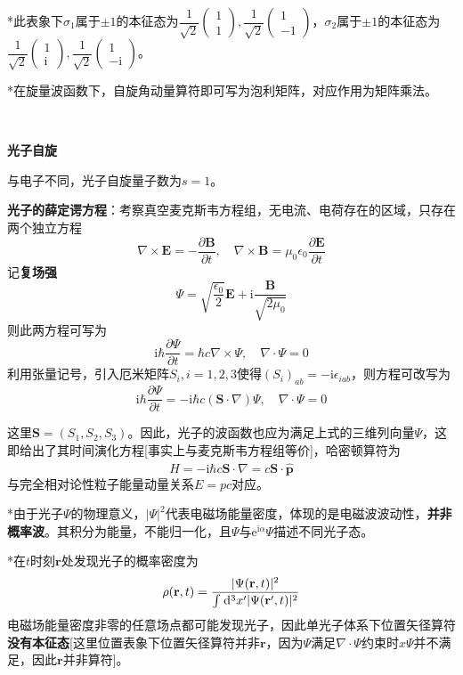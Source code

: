 \documentclass[a4paper,UTF8,fontset=windows]{ctexart}
\newcommand*{\dr}{\hspace{0.07em}\mathrm{d}}
\newcommand*{\ir}{\mathrm{i}}
\newcommand*{\er}{\mathrm{e}}
\newcommand*{\br}{\mathbf{r}}
\newcommand*{\bp}{\mathbf{p}}
\begin{document}
*此表象下$\sigma_1$属于$\pm1$的本征态为$\dfrac{1}{\sqrt2}\begin{pmatrix}1\\1\end{pmatrix},\dfrac{1}{\sqrt2}\begin{pmatrix}1\\-1\end{pmatrix}$，$\sigma_2$属于$\pm1$的本征态为$\dfrac{1}{\sqrt2}\begin{pmatrix}1\\\ir\end{pmatrix},\dfrac{1}{\sqrt2}\begin{pmatrix}1\\-\ir\end{pmatrix}$。

*在旋量波函数下，自旋角动量算符即可写为泡利矩阵，对应作用为矩阵乘法。

\

\textbf{光子自旋}

与电子不同，光子自旋量子数为$s=1$。

\textbf{光子的薛定谔方程}：考察真空麦克斯韦方程组，无电流、电荷存在的区域，只存在两个独立方程
$$\nabla\times\mathbf{E}=-\frac{\partial\mathbf{B}}{\partial t},\quad\nabla\times\mathbf{B}=\mu_0\epsilon_0\frac{\partial\mathbf{E}}{\partial t}$$
记\textbf{复场强}
$$\Psi=\sqrt{\frac{\epsilon_0}{2}}\mathbf{E}+\ir\frac{\mathbf{B}}{\sqrt{2\mu_0}}$$
则此两方程可写为
$$\ir\hbar\frac{\partial\Psi}{\partial t}=\hbar c\nabla\times\Psi,\quad\nabla\cdot\Psi=0$$
利用张量记号，引入厄米矩阵$S_i,i=1,2,3$使得$(S_i)_{ab}=-\ir\epsilon_{iab}$，则方程可改写为
$$\ir\hbar\frac{\partial\Psi}{\partial t}=-\ir\hbar c(\mathbf{S}\cdot\nabla)\Psi,\quad\nabla\cdot\Psi=0$$

这里$\mathbf{S}=(S_1,S_2,S_3)$。因此，光子的波函数也应为满足上式的三维列向量$\Psi$，这即给出了其时间演化方程[事实上与麦克斯韦方程组等价]，哈密顿算符为
$$\hat{H}=-\ir\hbar c\mathbf{S}\cdot\nabla=c\mathbf{S}\cdot\hat{\bp}$$
与完全相对论性粒子能量动量关系$E=pc$对应。

*由于光子$\Psi$的物理意义，$|\Psi|^2$代表电磁场能量密度，体现的是电磁波波动性，\textbf{并非概率波}。其积分为能量，不能归一化，且$\Psi$与$\er^{\ir\alpha}\Psi$描述不同光子态。

*在$t$时刻$\br$处发现光子的概率密度为
$$\rho(\br,t)=\frac{|\Psi(\br,t)|^2}{\int\dr^3x'|\Psi(\br',t)|^2}$$
电磁场能量密度非零的任意场点都可能发现光子，因此单光子体系下位置矢径算符\textbf{没有本征态}[这里位置表象下位置矢径算符并非$\br$，因为$\Psi$满足$\nabla\cdot\Psi$约束时$x\Psi$并不满足，因此$\br$并非算符]。
\end{document}
